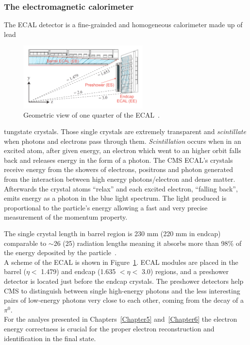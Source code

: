 \subsubsection{The electromagnetic calorimeter}
The ECAL detector is a fine-grainded and homogeneous calorimeter
made up of lead
\begin{figure}
  \begin{center}
    \includegraphics[clip,trim=1cm 1cm 1cm 1.5cm, width=0.58\textwidth]{Figures/c2/ecal}
  \end{center}
  \caption{Geometric view of one quarter of the ECAL~\cite{Benaglia_2014}.}
\label{fig:ecal}
\end{figure}
 tungstate crystals. Those single crystals are extremely transparent
 and \emph{scintillate} when photons and electrons pass through
 them. \emph{Scintillation} occurs when in an excited atom, after given
 energy, an electron which went to an higher orbit falls back and
 releases energy in the form of a photon. The CMS ECAL's crystals
 receive energy from the showers of electrons, positrons and photon
 generated from the interaction between high energy photons/electron and
 dense matter. Afterwards the crystal atoms ``relax'' and each
 excited electron, ``falling back'',
 emits energy as a photon in the blue light spectrum.
The light produced is proportional to the particle's energy
 allowing a fast and very precise measurement of the momentum
 property. 

The single crystal length in barrel region is 230 mm (220
 mm in endcap) comparable to $\sim$26 (25) radiation lengths meaning it
 absorbs more than 98\% of the energy deposited by the particle~\cite{Biino_2015}.\\
A scheme of the ECAL is shown in Figure~\ref{fig:ecal}.
ECAL modules are placed in the barrel ($\eta<$ 1.479) and endcap
(1.635 $<\eta<$ 3.0) regions, and a preshower detector is located just
before the endcap crystals. The preshower detectors help CMS to
distinguish between single high-energy photons and the less
interesting pairs of low-energy photons very close to each other, \ie
coming from the decay of a $\pi^0$. \\
For the analyes presented in Chapters~\ref{Chapter5}
and~\ref{Chapter6} the electron energy correctness is crucial for the
proper electron reconstruction and identification in the final
state. 

